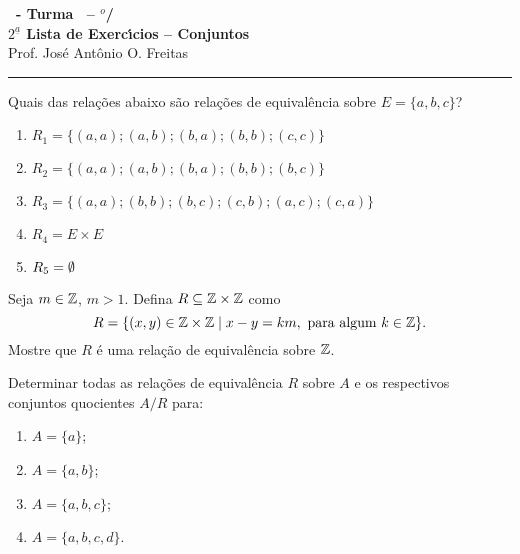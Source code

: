 \documentclass[12pt]{exam}
\begin{document}
\begin{center}
{\Large\bf \disciplina\ - Turma \turma\ -- \semestre$^{o}$/\ano} \\ \vspace{9pt} {\large\bf
  $2^{\underline{a}}$ Lista de Exerc{\'\i}cios -- Conjuntos}\\ \vspace{9pt} Prof. Jos{\'e} Ant{\^o}nio O. Freitas
\end{center}
\hrule

\vspace{.6cm}

\questao Quais das rela{\c c}{\~o}es abaixo s{\~a}o rela{\c c}{\~o}es de equival{\^e}ncia sobre $E = \{a,b,c\}$?
\begin{enumerate}[label={\alph*})]
\item $R_1 = \{(a,a);(a,b);(b,a);(b,b);(c,c)\}$
\item $R_2 = \{(a,a);(a,b);(b,a);(b,b);(b,c)\}$
\item $R_3 = \{(a,a);(b,b);(b,c);(c,b);(a,c);(c,a)\}$
\item $R_4 = E \times E$
\item $R_5 = \emptyset$
\end{enumerate}

\vspace{.3cm}

\questao Seja $m \in \mathbb{Z}$, $m > 1$. Defina $R \subseteq \mathbb{Z}\times\mathbb{Z}$ como
\[
  R = \{(x,y) \in \mathbb{Z}\times\mathbb{Z} \mid x - y = km, \mbox{ para algum } k \in \mathbb{Z}\}.
\]
Mostre que $R$ \'e uma rela\c{c}\~ao de equival\^encia sobre $\mathbb{Z}$.

\vspace{.3cm}

\questao Determinar todas as rela{\c c}{\~o}es de equival{\^e}ncia
$R$ sobre $A$ e os respectivos conjuntos quocientes $A/R$ para:
\begin{enumerate}[label={\alph*})]
\item $A=\{a\}$;
\item $A=\{a,b\}$;
\item $A=\{a,b,c\}$;
\item $A=\{a,b,c,d\}$.
\end{enumerate}

\vspace{.3cm}
\end{document}
